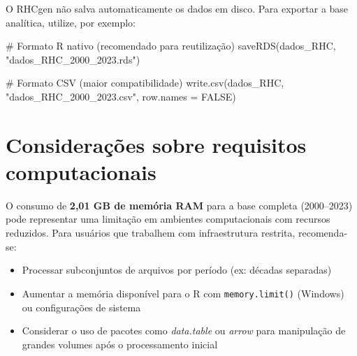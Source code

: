 \documentclass[
  brazilian,
  a4paper,
  oneside]{scrbook}
\newenvironment{Shaded}{\begin{snugshade}}{\end{snugshade}}
\newcommand{\AttributeTok}[1]{\textcolor[rgb]{0.40,0.45,0.13}{#1}}
\newcommand{\CommentTok}[1]{\textcolor[rgb]{0.37,0.37,0.37}{#1}}
\newcommand{\ConstantTok}[1]{\textcolor[rgb]{0.56,0.35,0.01}{#1}}
\newcommand{\FunctionTok}[1]{\textcolor[rgb]{0.28,0.35,0.67}{#1}}
\newcommand{\NormalTok}[1]{\textcolor[rgb]{0.00,0.23,0.31}{#1}}
\newcommand{\StringTok}[1]{\textcolor[rgb]{0.13,0.47,0.30}{#1}}
\providecommand{\tightlist}{%
  \setlength{\itemsep}{0pt}\setlength{\parskip}{0pt}}
\begin{document}
\begin{tcolorbox}[enhanced jigsaw, arc=.35mm, bottomrule=.15mm, bottomtitle=1mm, breakable, colback=white, colbacktitle=quarto-callout-tip-color!10!white, colframe=quarto-callout-tip-color-frame, coltitle=black, left=2mm, leftrule=.75mm, opacityback=0, opacitybacktitle=0.6, rightrule=.15mm, title=\textcolor{quarto-callout-tip-color}{\faLightbulb}\hspace{0.5em}{Exportação da base}, titlerule=0mm, toprule=.15mm, toptitle=1mm]

O RHCgen não salva automaticamente os dados em disco. Para exportar a
base analítica, utilize, por exemplo:

\begin{Shaded}
\begin{Highlighting}[]
\CommentTok{\# Formato R nativo (recomendado para reutilização)}
\FunctionTok{saveRDS}\NormalTok{(dados\_RHC, }\StringTok{"dados\_RHC\_2000\_2023.rds"}\NormalTok{)}

\CommentTok{\# Formato CSV (maior compatibilidade)}
\FunctionTok{write.csv}\NormalTok{(dados\_RHC, }\StringTok{"dados\_RHC\_2000\_2023.csv"}\NormalTok{, }\AttributeTok{row.names =} \ConstantTok{FALSE}\NormalTok{)}
\end{Highlighting}
\end{Shaded}

\end{tcolorbox}

\section{Considerações sobre requisitos
computacionais}\label{considerauxe7uxf5es-sobre-requisitos-computacionais}

O consumo de \textbf{2,01 GB de memória RAM} para a base completa
(2000--2023) pode representar uma limitação em ambientes computacionais
com recursos reduzidos. Para usuários que trabalhem com infraestrutura
restrita, recomenda-se:

\begin{itemize}
\tightlist
\item
  Processar subconjuntos de arquivos por período (ex: décadas separadas)
\item
  Aumentar a memória disponível para o R com \texttt{memory.limit()}
  (Windows) ou configurações de sistema
\item
  Considerar o uso de pacotes como \emph{data.table} ou \emph{arrow}
  para manipulação de grandes volumes após o processamento inicial
\end{itemize}
\end{document}
